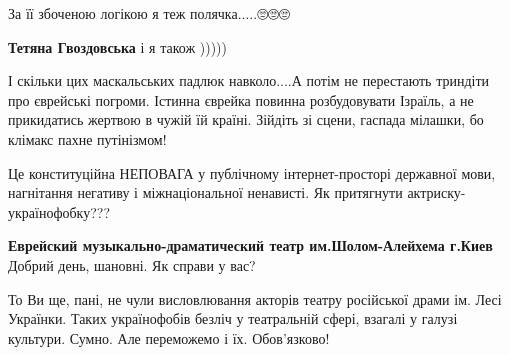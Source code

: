 \begin{itemize}
За її збоченою логікою я теж полячка.....🙄🙄🙄

\begin{itemize}
 
\textbf{Тетяна Гвоздовська} і я також )))))
\end{itemize}

 

І скільки цих маскальських падлюк навколо....А потім не перестають триндіти про
єврейські погроми. Істинна єврейка повинна розбудовувати Ізраїль, а не
прикидатись жертвою в чужій їй країні. Зійдіть зі сцени, гаспада мілашки, бо
клімакс пахне путінізмом!


 

Це конституційна НЕПОВАГА у публічному інтернет-просторі державної мови,
нагнітання негативу і міжнаціональної ненависті. Як притягнути
актриску-українофобку???


 

\textbf{Еврейский музыкально-драматический театр им.Шолом-Алейхема г.Киев} Добрий день, шановні. Як справи у вас?

 

То Ви ще, пані, не чули висловлювання акторів театру російської драми ім. Лесі
Українки. Таких українофобів безліч у театральній сфері, взагалі у галузі
культури. Сумно. Але переможемо і їх. Обов'язково!


\end{itemize}
